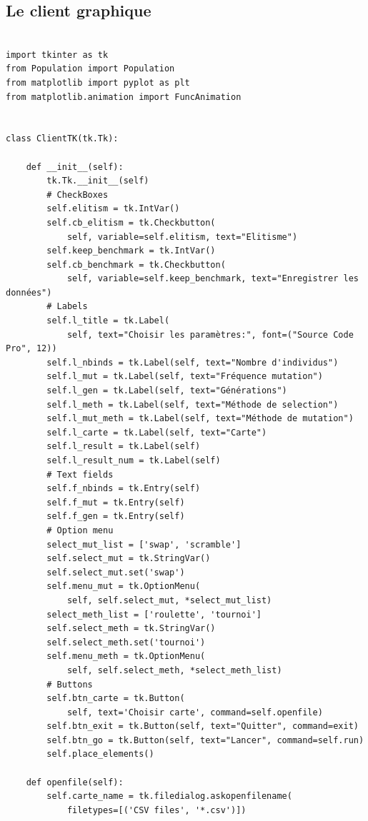 \documentclass[12pt]{article}
\begin{document}
\subsection*{Le client graphique}
\begin{verbatim}
  
import tkinter as tk
from Population import Population
from matplotlib import pyplot as plt
from matplotlib.animation import FuncAnimation


class ClientTK(tk.Tk):

    def __init__(self):
        tk.Tk.__init__(self)
        # CheckBoxes
        self.elitism = tk.IntVar()
        self.cb_elitism = tk.Checkbutton(
            self, variable=self.elitism, text="Elitisme")
        self.keep_benchmark = tk.IntVar()
        self.cb_benchmark = tk.Checkbutton(
            self, variable=self.keep_benchmark, text="Enregistrer les données")
        # Labels
        self.l_title = tk.Label(
            self, text="Choisir les paramètres:", font=("Source Code Pro", 12))
        self.l_nbinds = tk.Label(self, text="Nombre d'individus")
        self.l_mut = tk.Label(self, text="Fréquence mutation")
        self.l_gen = tk.Label(self, text="Générations")
        self.l_meth = tk.Label(self, text="Méthode de selection")
        self.l_mut_meth = tk.Label(self, text="Méthode de mutation")
        self.l_carte = tk.Label(self, text="Carte")
        self.l_result = tk.Label(self)
        self.l_result_num = tk.Label(self)
        # Text fields
        self.f_nbinds = tk.Entry(self)
        self.f_mut = tk.Entry(self)
        self.f_gen = tk.Entry(self)
        # Option menu
        select_mut_list = ['swap', 'scramble']
        self.select_mut = tk.StringVar()
        self.select_mut.set('swap')
        self.menu_mut = tk.OptionMenu(
            self, self.select_mut, *select_mut_list)
        select_meth_list = ['roulette', 'tournoi']
        self.select_meth = tk.StringVar()
        self.select_meth.set('tournoi')
        self.menu_meth = tk.OptionMenu(
            self, self.select_meth, *select_meth_list)
        # Buttons
        self.btn_carte = tk.Button(
            self, text='Choisir carte', command=self.openfile)
        self.btn_exit = tk.Button(self, text="Quitter", command=exit)
        self.btn_go = tk.Button(self, text="Lancer", command=self.run)
        self.place_elements()

    def openfile(self):
        self.carte_name = tk.filedialog.askopenfilename(
            filetypes=[('CSV files', '*.csv')])


\end{verbatim}
\end{document}
